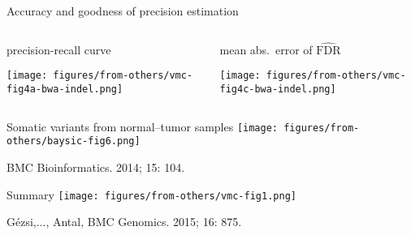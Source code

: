 \documentclass{beamer} %
\begin{document}
\begin{frame}{Accuracy and goodness of precision estimation}
\begin{columns}[t]
\begin{column}{0.7\textwidth}
precision-recall curve
\bigskip

\texttt{[image: figures/from-others/vmc-fig4a-bwa-indel.png]}
\end{column}

\begin{column}{0.35\textwidth}
mean abs.~error of \(\widehat{\text{FDR}}\)
\bigskip

\texttt{[image: figures/from-others/vmc-fig4c-bwa-indel.png]}
\end{column}
\end{columns}
\end{frame}

\begin{frame}{Somatic variants from normal--tumor samples}
\texttt{[image: figures/from-others/baysic-fig6.png]}
\bigskip

{\footnotesize BMC Bioinformatics. 2014; 15: 104.}
\end{frame}

\begin{frame}{Summary}
\texttt{[image: figures/from-others/vmc-fig1.png]}
\bigskip

{\footnotesize G\'{e}zsi,..., Antal, BMC Genomics. 2015; 16: 875.}
\end{frame}

\end{document}

